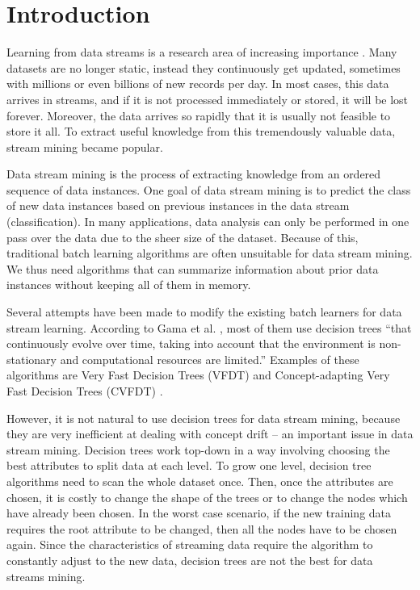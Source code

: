 \documentclass[conference]{IEEEtran}
\begin{document}
		
		
		\section{Introduction}
		\label{sec:introduction}
		
		Learning from data streams is a research area of increasing importance \cite{evaluation_stream_mining}. Many datasets are no longer static, instead they continuously get updated, sometimes with millions or even billions of new records per day. In most cases, this data arrives in streams, and if it is not processed immediately or stored, it will be lost forever. Moreover, the data arrives so rapidly that it is usually not feasible to store it all. To extract useful knowledge from this tremendously valuable data, stream mining became popular.
		
		Data stream mining is the process of extracting knowledge from an ordered sequence of data instances. One goal of data stream mining is to predict the class of new data instances based on previous instances in the data stream (classification). In many applications, data analysis can only be performed in one pass over the data due to the sheer size of the dataset. Because of this, traditional batch learning algorithms are often unsuitable for data stream mining.  We thus need algorithms that can summarize information about prior data instances without keeping all of them in memory.  
		
		Several attempts have been made to modify the existing batch learners for data stream learning. According to Gama et al. \cite{evaluation_stream_mining}, most of them use decision trees ``that continuously evolve over time, taking into account that the environment is non-stationary and computational resources are limited.'' Examples of these algorithms are Very Fast Decision Trees (VFDT) \cite{VFDT} and Concept-adapting Very Fast Decision Trees (CVFDT) \cite{CVFDT}.

		However, it is not natural to use decision trees for data stream mining, because they are very inefficient at dealing with concept drift -- an important issue in data stream mining. Decision trees work top-down in a way involving choosing the best attributes to split data at each level. To grow one level, decision tree algorithms need to scan the whole dataset once. Then, once the attributes are chosen, it is costly to change the shape of the trees or to change the nodes which have already been chosen. In the worst case scenario, if the new training data requires the root attribute to be changed, then all the nodes have to be chosen again. Since the characteristics of streaming data require the algorithm to constantly adjust to the new data, decision trees are not the best for data streams mining. 
		
\end{document}
